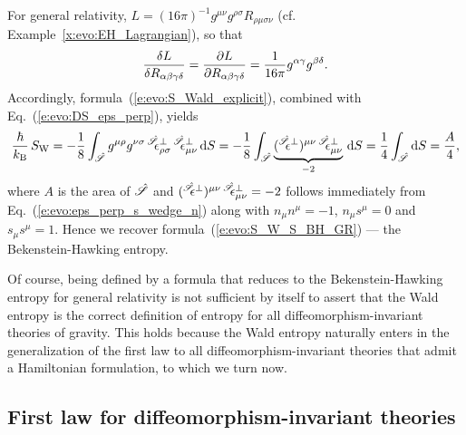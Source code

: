 \begin{example}
For general relativity,  $L = (16\pi)^{-1} g^{\mu\nu} g^{\rho\sigma} R_{\rho\mu\sigma\nu}$
(cf. Example~\ref{x:evo:EH_Lagrangian}), so that
\[
    \frac{\delta L}{\delta R_{\alpha\beta\gamma\delta}} = \frac{\partial L}{\partial R_{\alpha\beta\gamma\delta}}
    = \frac{1}{16\pi} g^{\alpha\gamma} g^{\beta\delta} .
\]
Accordingly, formula~(\ref{e:evo:S_Wald_explicit}), combined with Eq.~(\ref{e:evo:DS_eps_perp}), yields
\[
    \frac{\hbar}{k_{\rm  B}} \, S_{\rm W}  = -\frac{1}{8} \int_{\hat{\Sp}} g^{\mu\rho} g^{\nu\sigma} \,
    {}^{\hat{\Sp}}\!\!\eps^\perp_{\rho\sigma} \, {}^{\hat{\Sp}}\!\!\eps^\perp_{\mu\nu} \,
    \D S
    = - \frac{1}{8} \int_{\hat{\Sp}}
    \underbrace{({}^{\hat{\Sp}}\!\!\eps^\perp)^{\mu\nu} \, {}^{\hat{\Sp}}\!\!\eps^\perp_{\mu\nu}}_{-2} \,  \D S
    = \frac{1}{4} \int_{\hat{\Sp}} \D S  = \frac{A}{4} ,
\]
where $A$ is the area of $\hat{\mathscr{S}}$ and $({}^{\hat{\mathscr{S}}}\!\!\epsilon^\perp)^{\mu\nu} \, {}^{\hat{\mathscr{S}}}\!\!\epsilon^\perp_{\mu\nu}=-2$
follows immediately from Eq.~(\ref{e:evo:eps_perp_s_wedge_n}) along with
$n_\mu n^\mu = -1$, $n_\mu s^\mu = 0$ and $s_\mu s^\mu = 1$.
Hence we recover formula~(\ref{e:evo:S_W_S_BH_GR}) --- the Bekenstein-Hawking entropy.
\end{example}

Of course, being defined by a formula that reduces to the Bekenstein-Hawking entropy
for general relativity is not sufficient by itself to assert that the Wald entropy
is the correct definition of entropy for all diffeomorphism-invariant theories
of gravity. This holds because the Wald entropy naturally enters in the
generalization of the first law to all diffeomorphism-invariant theories
that admit a Hamiltonian formulation, to which we turn now.

\subsection{First law for diffeomorphism-invariant theories}

